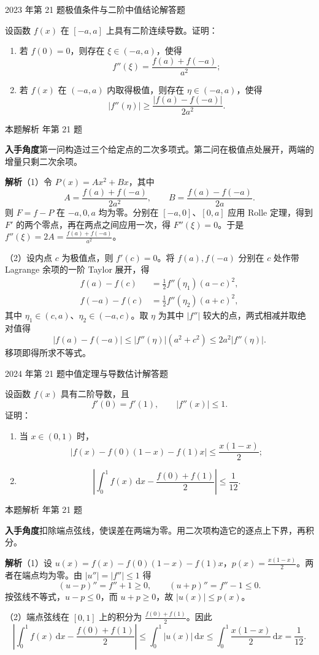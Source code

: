 \documentclass[UTF8,zihao=-4,fontset=fandol]{ctexart}
\newcommand{\QuestionPage}[6]{%
  \par\noindent\begin{minipage}{\linewidth}
  \raggedright
  {\small\textcolor{black!60}{#3\quad #5}\hfill\textcolor{accent}{#2}}\par\smallskip}
\newcommand{\QuestionEnd}{\end{minipage}\par\medskip}
\newcommand{\QuestionPage}[6]{%
  \clearpage
  {\small\textcolor{accent}{#1\hfill #2}}\par\medskip
  {\small\textcolor{black!60}{#3\quad #5\hfill #6}}\par\vspace{9bp}}
\newcommand{\QuestionEnd}{}
\newenvironment{QuestionSolution}[1]{%
  \clearpage
  {\small\textcolor{black!60}{本题解析\quad #1}}\par\medskip
}{\par\clearpage}
\begin{document}
\QuestionPage{2.4 微分中值定理及其应用}{解答题}{2023 年第 21 题}{4}{极值条件与二阶中值结论}{094 / 234}
设函数 \(f(x)\) 在 \([-a,a]\) 上具有二阶连续导数。证明：
\begin{enumerate}
\item 若 \(f(0)=0\)，则存在 \(\xi\in(-a,a)\)，使得
\[f''(\xi)=\frac{f(a)+f(-a)}{a^2};
\]
\item 若 \(f(x)\) 在 \((-a,a)\) 内取得极值，则存在 \(\eta\in(-a,a)\)，使得
\[|f''(\eta)|\ge \frac{|f(a)-f(-a)|}{2a^2}.
\]
\end{enumerate}
\QuestionEnd

\begin{QuestionSolution}{2023 年第 21 题}
\textbf{入手角度}\quad 第一问构造过三个给定点的二次多项式。第二问在极值点处展开，两端的增量只剩二次余项。

\textbf{解析}\quad （1）令 \(P(x)=Ax^2+Bx\)，其中
\[
A=\frac{f(a)+f(-a)}{2a^2},\qquad
B=\frac{f(a)-f(-a)}{2a}.
\]
则 \(F=f-P\) 在 \(-a,0,a\) 均为零。分别在 \([-a,0]\)、\([0,a]\) 应用 Rolle 定理，得到 \(F'\) 的两个零点，再在两点之间应用一次，得 \(F''(\xi)=0\)。于是 \(f''(\xi)=2A=\frac{f(a)+f(-a)}{a^2}\)。

（2）设内点 \(c\) 为极值点，则 \(f'(c)=0\)。将 \(f(a),f(-a)\) 分别在 \(c\) 处作带 Lagrange 余项的一阶 Taylor 展开，得
\[
\begin{aligned}
f(a)-f(c)&=\tfrac12 f''(\eta_1)(a-c)^2,\\
f(-a)-f(c)&=\tfrac12 f''(\eta_2)(a+c)^2,
\end{aligned}
\]
其中 \(\eta_1\in(c,a)\)、\(\eta_2\in(-a,c)\)。取 \(\eta\) 为其中 \(|f''|\) 较大的点，两式相减并取绝对值得
\[
|f(a)-f(-a)|\le |f''(\eta)|(a^2+c^2)
\le 2a^2|f''(\eta)|.
\]
移项即得所求不等式。
\end{QuestionSolution}

\QuestionPage{2.4 微分中值定理及其应用}{解答题}{2024 年第 21 题}{3}{中值定理与导数估计}{095 / 234}
设函数 \(f(x)\) 具有二阶导数，且
\[f'(0)=f'(1),\qquad |f''(x)|\le 1.
\]
证明：
\begin{enumerate}
\item 当 \(x\in(0,1)\) 时，
\[\left|f(x)-f(0)(1-x)-f(1)x\right|\le \frac{x(1-x)}{2};
\]
\item \[\left|\int_0^1 f(x)\,\mathrm{d}x-\frac{f(0)+f(1)}{2}\right|\le \frac{1}{12}.
\]
\end{enumerate}
\QuestionEnd

\begin{QuestionSolution}{2024 年第 21 题}
\textbf{入手角度}\quad 扣除端点弦线，使误差在两端为零。用二次项构造它的逐点上下界，再积分。

\textbf{解析}\quad （1）设 \(u(x)=f(x)-f(0)(1-x)-f(1)x\)，\(p(x)=\frac{x(1-x)}{2}\)。两者在端点均为零。由 \(|u''|=|f''|\le1\) 得
\[
(u-p)''=f''+1\ge0,\qquad
(u+p)''=f''-1\le0.
\]
按弦线不等式，\(u-p\le0\)，而 \(u+p\ge0\)，故 \(|u(x)|\le p(x)\)。

（2）端点弦线在 \([0,1]\) 上的积分为 \(\frac{f(0)+f(1)}{2}\)。因此
\[
\left|\int_0^1 f(x)\,\mathrm{d}x-\frac{f(0)+f(1)}2\right|
\le\int_0^1 |u(x)|\,\mathrm{d}x
\le\int_0^1\frac{x(1-x)}2\,\mathrm{d}x=\frac1{12}.
\]
\end{QuestionSolution}
\end{document}
